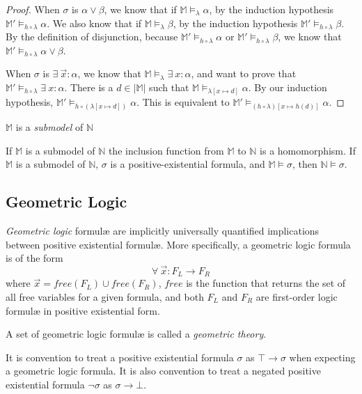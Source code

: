 \begin{proof}
			When $\sigma$ is $\alpha \vee \beta$, we know that if $\mathbb{M}
			\models_\lambda \alpha$, by the induction hypothesis $\mathbb{M}'
			\models_{h\circ\lambda} \alpha$. We also know that if $\mathbb{M}
			\models_\lambda \beta$, by the induction hypothesis $\mathbb{M}'
			\models_{h\circ\lambda} \beta$. By the definition of disjunction,
			because $\mathbb{M}' \models_{h\circ\lambda} \alpha$ or
			$\mathbb{M}' \models_{h\circ\lambda} \beta$, we know that
			$\mathbb{M}' \models_{h\circ\lambda} \alpha \vee \beta$.

			When $\sigma$ is $\exists\ \vec x : \alpha$, we know that
			$\mathbb{M} \models_\lambda \exists\ x : \alpha$, and want to prove
			that $\mathbb{M}' \models_{h\circ\lambda} \exists\ x : \alpha$.
			There is a $d \in |\mathbb{M}|$ such that $\mathbb{M}
			\models_{\lambda[x\mapsto d]} \alpha$. By our induction
			hypothesis, $\mathbb{M}' \models_{h\circ(\lambda[x\mapsto d])}
			\alpha$. This is equivalent to $\mathbb{M}'
			\models_{(h\circ\lambda)[x\mapsto h(d)]} \alpha$.
		\end{proof}

		$\mathbb{M}$ is a \emph{submodel} of $\mathbb{N}$

		\begin{corollary}
			If $\mathbb{M}$ is a submodel of $\mathbb{N}$ the inclusion
			function from $\mathbb{M}$ to $\mathbb{N}$ is a homomorphism. If
			$\mathbb{M}$ is a submodel of $\mathbb{N}$, $\sigma$ is a
			positive-existential formula, and $\mathbb{M} \models \sigma$, then
			$\mathbb{N} \models \sigma$.
		\end{corollary}

	\subsection{Geometric Logic}
	\label{sec:technical_background.geometric_logic}

		\emph{Geometric logic} formul{\ae} are implicitly universally
		quantified implications between positive existential formul{\ae}. More
		specifically, a geometric logic formula is of the form
			\[
			\forall\ \vec{x} : F_L \to F_R
			\]
		where $\vec{x} = free(F_L) \cup free(F_R)$, $free$ is the function that
		returns the set of all free variables for a given formula, and both
		$F_L$ and $F_R$ are first-order logic formul{\ae} in positive
		existential form.

		A set of geometric logic formul{\ae} is called a \emph{geometric
		theory}.

		It is convention to treat a positive existential formula $\sigma$ as
		$\top \to \sigma$ when expecting a geometric logic formula. It is also
		convention to treat a negated positive existential formula $\neg\sigma$
		as $\sigma \to \bot$.


